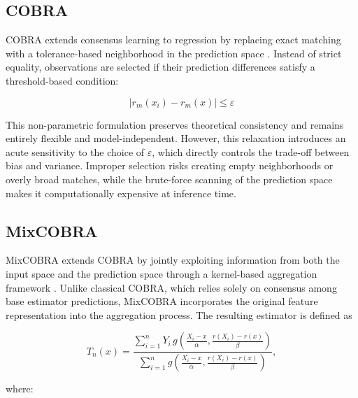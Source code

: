 \subsection{COBRA}

\hs COBRA extends consensus learning to regression by replacing exact matching with a tolerance-based neighborhood in the prediction space \cite{biau2016}. Instead of strict equality, observations are selected if their prediction differences satisfy a threshold-based condition:

\[    
    |r_m(x_i) - r_m(x)| \leq \varepsilon
\]

This non-parametric formulation preserves theoretical consistency and remains entirely flexible and model-independent. However, this relaxation introduces an acute sensitivity to the choice of $\varepsilon$, which directly controls the trade-off between bias and variance. Improper selection risks creating empty neighborhoods or overly broad matches, while the brute-force scanning of the prediction space makes it computationally expensive at inference time.

\subsection{MixCOBRA}

\hs MixCOBRA extends COBRA by jointly exploiting information from both the input space and the prediction space through a kernel-based aggregation framework \cite{fischer2019}. Unlike classical COBRA, which relies solely on consensus among base estimator predictions, MixCOBRA incorporates the original feature representation into the aggregation process. The resulting estimator is defined as

\[    
    T_{n}(x)
    =
    \frac{    
        \sum_{i=1}^{n}
        Y_i\,g\!\left(
        \frac{X_i-x}{\alpha},
        \frac{r(X_i)-r(x)}{\beta}
        \right)
    }{    
        \sum_{i=1}^{n}
        g\!\left(
        \frac{X_i-x}{\alpha},
        \frac{r(X_i)-r(x)}{\beta}
        \right)
    },
\]

where:

